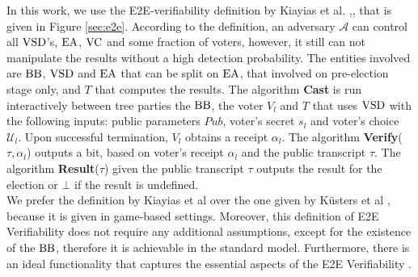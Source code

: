  In this work, we use the E2E-verifiability definition by Kiayias et al. \cite{Kiayias2015a},\cite{Kiayias2015}, that is given in Figure \ref{sec:e2e}. 
According to the definition, an adversary $\mathcal{A}$ can control all $\operatorname{VSD}$'s, $\operatorname{EA}$, $\operatorname{VC}$ and some fraction of voters, however, it still can not manipulate the results without a high detection probability.  The entities involved are $\operatorname{BB}$, $\operatorname{VSD}$ and $\operatorname{EA}$ that can be split on $\operatorname{EA}$, that involved on pre-election stage only, and $T$ that computes the results. The algorithm \textbf{Cast} is run interactively between tree parties the $\operatorname{BB}$, the voter $V_l$ and $T$ that uses $\operatorname{VSD}$ with the following inputs: public parameters $Pub$, voter's secret $s_l$ and voter's choice $\mathcal{U}_l$. Upon successful termination, $V_l$ obtains a receipt $\alpha_l$. The algorithm \textbf{Verify}($\tau,\alpha_l$) outputs a bit, based on voter's receipt $\alpha_l$ and the public transcript $\tau$. The algorithm \textbf{Result}($\tau$) given the public transcript $\tau$  outputs the result for the election or $\bot$ if the result is undefined.\\

We prefer the definition by Kiayias et al over the one given by K\"{u}sters et al \cite{Kusters2010}, because it is given in game-based settings. Moreover, this definition of E2E Verifiability does not require any additional assumptions, except for the existence of the $\operatorname{BB}$, therefore it is achievable in the standard model. Furthermore, there is an ideal functionality that captures the essential aspects of the E2E Verifiability \cite{idfunc}.  

